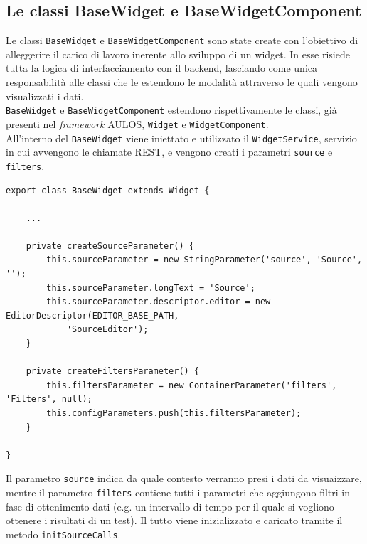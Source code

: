 \subsection{Le classi BaseWidget e BaseWidgetComponent}
\label{subsec:base}
Le classi \verb|BaseWidget| e \verb|BaseWidgetComponent| sono state create con l'obiettivo di alleggerire il carico di lavoro inerente allo sviluppo di un widget. In esse risiede tutta la logica di interfacciamento con il backend, lasciando come unica responsabilità alle classi che le estendono le modalità attraverso le quali vengono visualizzati i dati.
\\
\verb|BaseWidget| e \verb|BaseWidgetComponent| estendono rispettivamente le classi, già presenti nel \textit{framework} AULOS, \verb|Widget| e \verb|WidgetComponent|.
\\
All'interno del \verb|BaseWidget| viene iniettato e utilizzato il \verb|WidgetService|, servizio in cui avvengono le chiamate REST, e vengono creati i parametri \verb|source| e \verb|filters|. 

\begin{lstlisting}[caption={Creazione dei parametri all'interno della classe BaseWidget}, style=javaScriptCode]
export class BaseWidget extends Widget {

    ...

    private createSourceParameter() {
        this.sourceParameter = new StringParameter('source', 'Source', '');
        this.sourceParameter.longText = 'Source';
        this.sourceParameter.descriptor.editor = new EditorDescriptor(EDITOR_BASE_PATH,
            'SourceEditor');
    }

    private createFiltersParameter() {
        this.filtersParameter = new ContainerParameter('filters', 'Filters', null);
        this.configParameters.push(this.filtersParameter);
    }

}
\end{lstlisting}

Il parametro \verb|source| indica da quale contesto verranno presi i dati da visuaizzare, mentre il parametro \verb|filters| contiene tutti i parametri che aggiungono filtri in fase di ottenimento dati (e.g. un intervallo di tempo per il quale si vogliono ottenere i risultati di un test). Il tutto viene inizializzato e caricato tramite il metodo \verb|initSourceCalls|.

